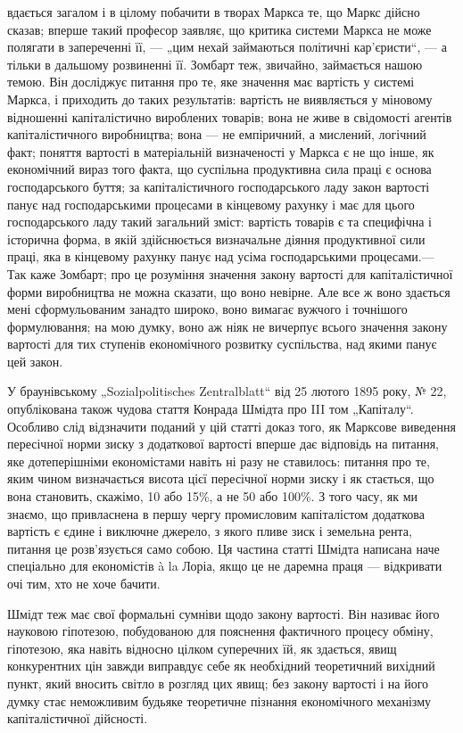 \parcont{}  %
вдається загалом і в цілому побачити в творах Маркса те, що Маркс дійсно сказав; вперше такий професор заявляє, що
критика системи Маркса не може полягати в запереченні її, — „цим нехай займаються політичні кар’єристи“, — а тільки в дальшому
розвиненні її. Зомбарт теж, звичайно, займається нашою темою. Він досліджує питання про те, яке значення має вартість у
системі Маркса, і приходить до таких результатів: вартість не виявляється у міновому відношенні капіталістично
вироблених товарів; вона не живе в свідомості агентів капіталістичного виробництва; вона — не емпіричний, а мислений,
логічний факт; поняття вартості в матеріальній визначеності у Маркса є не що інше, як економічний вираз того факта, що
суспільна продуктивна сила праці є основа господарського буття; за капіталістичного господарського ладу закон вартості панує
над господарськими процесами в кінцевому рахунку і має для цього господарського ладу такий загальний зміст: вартість товарів
є та специфічна і історична форма, в якій здійснюється визначальне діяння продуктивної сили праці, яка в кінцевому рахунку
панує над усіма господарськими процесами.— Так каже Зомбарт; про це розуміння значення закону вартості для капіталістичної
форми виробництва не можна сказати, що воно невірне. Але все ж воно здається мені сформульованим занадто широко, воно
вимагає вужчого і точнішого формулювання; на мою думку, воно аж ніяк не вичерпує всього значення закону вартості для тих
ступенів економічного розвитку суспільства, над якими панує цей закон.

У браунівському „Sozialpolitisches Zentralblatt“ від
25 лютого 1895 року, № 22, опублікована також чудова стаття Конрада Шмідта про III том „Капіталу“. Особливо слід відзначити
поданий у цій статті доказ того, як Марксове виведення пересічної норми зиску з додаткової вартості вперше дає відповідь на
питання, яке дотеперішніми економістами навіть ні разу не ставилось:  питання про те, яким чином визначається висота цієї
пересічної норми зиску і як стається, що вона становить, скажімо, 10 або 15\%, а не 50 або 100\%. З того часу, як ми
знаємо, що привласнена в першу чергу промисловим капіталістом додаткова вартість є єдине і виключне джерело, з якого пливе
зиск і земельна рента, питання це розв’язується само собою. Ця частина статті Шмідта написана наче спеціально для
економістів à la Лоріа, якщо це не даремна праця — відкривати очі тим, хто не хоче бачити.

Шмідт теж має свої формальні
сумніви щодо закону вартості. Він називає його науковою гіпотезою, побудованою для пояснення фактичного процесу обміну,
гіпотезою, яка навіть відносно цілком суперечних їй, як здається, явищ конкурентних цін завжди виправдує себе як необхідний
теоретичний вихідний пункт, який вносить світло в розгляд цих явищ; без закону вартості і на його думку стає неможливим
будьяке теоретичне пізнання економічного механізму капіталістичної дійсності.
\parbreak{}  %

